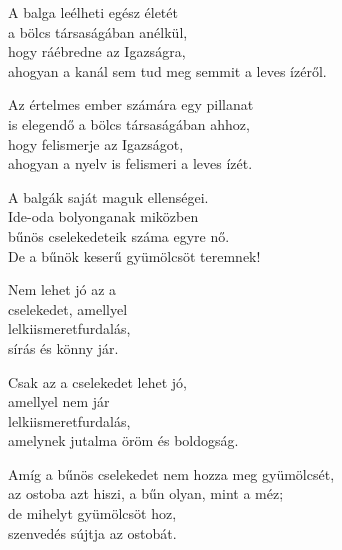 \begin{dhpverse}

 A balga leélheti egész életét\\
a bölcs társaságában anélkül,\\
hogy ráébredne az Igazságra,\\
ahogyan a kanál sem tud meg semmit a leves ízéről.

 Az értelmes ember számára egy pillanat\\
is elegendő a bölcs társaságában ahhoz,\\
hogy felismerje az Igazságot,\\
ahogyan a nyelv is felismeri a leves ízét.

 A balgák saját maguk ellenségei.\\
Ide-oda bolyonganak miközben\\
bűnös cselekedeteik száma egyre nő.\\
De a bűnök keserű gyümölcsöt teremnek!

 Nem lehet jó az a\\
cselekedet, amellyel\\
lelkiismeretfurdalás,\\
sírás és könny jár.

 Csak az a cselekedet lehet jó,\\
amellyel nem jár\\
lelkiismeretfurdalás,\\
amelynek jutalma öröm és boldogság.

 Amíg a bűnös cselekedet nem hozza meg gyümölcsét,\\
az ostoba azt hiszi, a bűn olyan, mint a méz;\\
de mihelyt gyümölcsöt hoz,\\
szenvedés sújtja az ostobát.

\end{dhpverse}
\newpage
